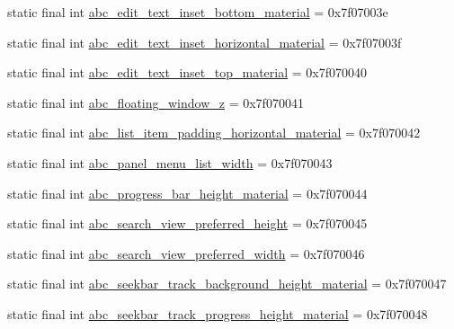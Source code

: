 \begin{CompactItemize}
\item 
static final int \hyperlink{classandroid_1_1support_1_1graphics_1_1drawable_1_1_r_1_1dimen_72682c3a578c003944859fcb29fa1e3f}{abc\_\-edit\_\-text\_\-inset\_\-bottom\_\-material} = 0x7f07003e
\item 
static final int \hyperlink{classandroid_1_1support_1_1graphics_1_1drawable_1_1_r_1_1dimen_5caa722386d78e0b574446669b91c9ab}{abc\_\-edit\_\-text\_\-inset\_\-horizontal\_\-material} = 0x7f07003f
\item 
static final int \hyperlink{classandroid_1_1support_1_1graphics_1_1drawable_1_1_r_1_1dimen_d418e63dc399055c555900be096aea73}{abc\_\-edit\_\-text\_\-inset\_\-top\_\-material} = 0x7f070040
\item 
static final int \hyperlink{classandroid_1_1support_1_1graphics_1_1drawable_1_1_r_1_1dimen_481c6d9dc979ccd96e615edfa7d57150}{abc\_\-floating\_\-window\_\-z} = 0x7f070041
\item 
static final int \hyperlink{classandroid_1_1support_1_1graphics_1_1drawable_1_1_r_1_1dimen_9e9ed905e292be90ac8740ddc7211b53}{abc\_\-list\_\-item\_\-padding\_\-horizontal\_\-material} = 0x7f070042
\item 
static final int \hyperlink{classandroid_1_1support_1_1graphics_1_1drawable_1_1_r_1_1dimen_5a26021fb120e7231d6794cbda4be15a}{abc\_\-panel\_\-menu\_\-list\_\-width} = 0x7f070043
\item 
static final int \hyperlink{classandroid_1_1support_1_1graphics_1_1drawable_1_1_r_1_1dimen_dba538c29c0bfa58c034b5c5f7472f4c}{abc\_\-progress\_\-bar\_\-height\_\-material} = 0x7f070044
\item 
static final int \hyperlink{classandroid_1_1support_1_1graphics_1_1drawable_1_1_r_1_1dimen_aaa86794477a3711fbd41a9dbe343911}{abc\_\-search\_\-view\_\-preferred\_\-height} = 0x7f070045
\item 
static final int \hyperlink{classandroid_1_1support_1_1graphics_1_1drawable_1_1_r_1_1dimen_6d203daf570dd470a98d56e4b4a08ff5}{abc\_\-search\_\-view\_\-preferred\_\-width} = 0x7f070046
\item 
static final int \hyperlink{classandroid_1_1support_1_1graphics_1_1drawable_1_1_r_1_1dimen_a99fe61cf70841d342203c9cd3099cd3}{abc\_\-seekbar\_\-track\_\-background\_\-height\_\-material} = 0x7f070047
\item 
static final int \hyperlink{classandroid_1_1support_1_1graphics_1_1drawable_1_1_r_1_1dimen_0e28ae136c2b15dd0d61ff3cc134ee2c}{abc\_\-seekbar\_\-track\_\-progress\_\-height\_\-material} = 0x7f070048
\item 

\end{CompactItemize}
